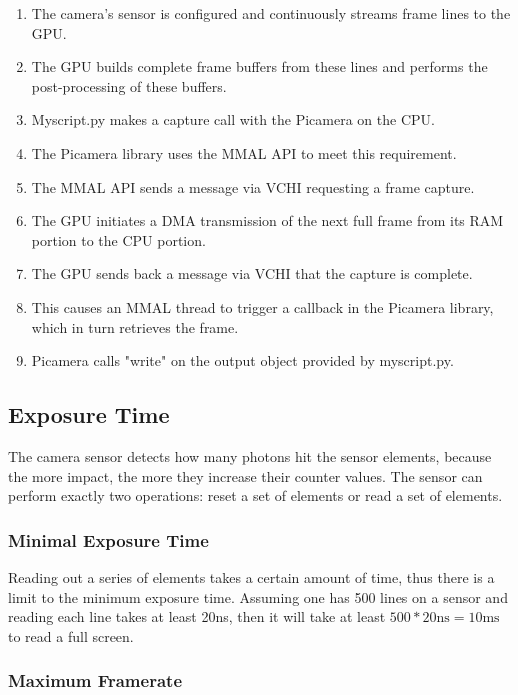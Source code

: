 \documentclass[12pt, a4paper]{report}
\begin{document}
    \begin{enumerate}
    \item The camera's sensor is configured and continuously streams frame lines to the GPU.
    \item The GPU builds complete frame buffers from these lines and performs the post-processing of these buffers.
    \item Myscript.py makes a capture call with the Picamera on the CPU.
    \item The Picamera library uses the MMAL API to meet this requirement.
    \item The MMAL API sends a message via VCHI requesting a frame capture.
    \item The GPU initiates a DMA transmission of the next full frame from its RAM portion to the CPU portion.
    \item The GPU sends back a message via VCHI that the capture is complete.
    \item This causes an MMAL thread to trigger a callback in the Picamera library, which in turn retrieves the frame.
    \item Picamera calls "write" on the output object provided by myscript.py.
    \end{enumerate}
    
    \subsection{Exposure Time}
    
    The camera sensor detects how many photons hit the sensor elements, because the more impact, the more they increase their counter values. The sensor can perform exactly two operations: reset a set of elements or read a set of elements.
    
    \subsubsection{Minimal Exposure Time}
    
    Reading out a series of elements takes a certain amount of time, thus there is a limit to the minimum exposure time. Assuming one has 500 lines on a sensor and reading each line takes at least 20ns, then it will take at least $500*20 \text{ns} = 10 \text{ms}$ to read a full screen. 
    
    \subsubsection{Maximum Framerate}
    
\end{document}
